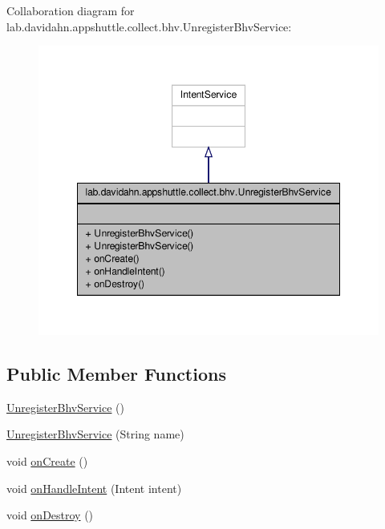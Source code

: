 \-Collaboration diagram for lab.\-davidahn.\-appshuttle.\-collect.\-bhv.\-Unregister\-Bhv\-Service\-:
\nopagebreak
\begin{figure}[H]
\begin{center}
\leavevmode
\includegraphics[width=348pt]{classlab_1_1davidahn_1_1appshuttle_1_1collect_1_1bhv_1_1_unregister_bhv_service__coll__graph}
\end{center}
\end{figure}
\subsection*{\-Public \-Member \-Functions}
\begin{DoxyCompactItemize}
\item 
\hyperlink{classlab_1_1davidahn_1_1appshuttle_1_1collect_1_1bhv_1_1_unregister_bhv_service_afcd39c8f6793908e735c7a90adf66c17}{\-Unregister\-Bhv\-Service} ()
\item 
\hyperlink{classlab_1_1davidahn_1_1appshuttle_1_1collect_1_1bhv_1_1_unregister_bhv_service_a28f7d8a9279a7a6350a845f8bab6ad63}{\-Unregister\-Bhv\-Service} (\-String name)
\item 
void \hyperlink{classlab_1_1davidahn_1_1appshuttle_1_1collect_1_1bhv_1_1_unregister_bhv_service_a2d6b19f00a847cb24a031d1ca6600ecd}{on\-Create} ()
\item 
void \hyperlink{classlab_1_1davidahn_1_1appshuttle_1_1collect_1_1bhv_1_1_unregister_bhv_service_ae07557aa8f7cc83f82cb7d77b21f1c3c}{on\-Handle\-Intent} (\-Intent intent)
\item 
void \hyperlink{classlab_1_1davidahn_1_1appshuttle_1_1collect_1_1bhv_1_1_unregister_bhv_service_aa8ea1d484ad97033410b1f47a1bf8c2d}{on\-Destroy} ()
\end{DoxyCompactItemize}


